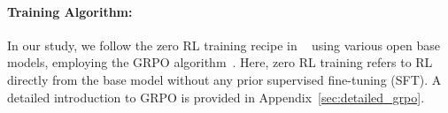 
\label{sec:training_algorithm}

\paragraph{Training Algorithm:}
In our study, we follow the zero RL training recipe in ~\citet{guo2025deepseek} using various open base models, employing the GRPO algorithm~\citep{shao2024deepseekmath}. Here, zero RL training refers to RL directly from the base model without any prior supervised fine-tuning (SFT). A detailed introduction to GRPO is provided in Appendix~\ref{sec:detailed_grpo}.
\label{sec:dataset_setting}

